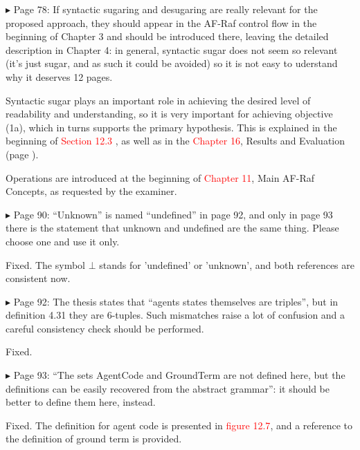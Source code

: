 \documentclass{article}
\newcommand*\R[1]{\textcolor{red}{#1}} %
\newenvironment{them}%
  {\bigskip\noindent\begingroup\color{blue}$\blacktriangleright$\enspace}%
  {\endgroup\par}
\begin{document}
\begin{them}
Page 78:
If syntactic sugaring and desugaring are really relevant for the proposed
approach, they should appear in the AF-Raf control flow in the beginning of
Chapter 3 and should be introduced there, leaving the detailed description in
Chapter 4: in general, syntactic sugar does not seem so relevant (it's just
sugar, and as such it could be avoided) so it is not easy to uderstand why it
deserves 12 pages.
\end{them}

Syntactic sugar plays an important role in achieving the desired level of
readability and understanding, so it is very important for achieving objective
(1a), which in turns supports the primary hypothesis. This is explained in the
beginning of \R{Section 12.3} , as well as in the \R{Chapter 16}, Results and
Evaluation (page ).

Operations are introduced at the beginning of \R{Chapter 11}, Main AF-Raf
Concepts, as requested by the examiner.

\begin{them}
Page 90:
``Unknown'' is named ``undefined'' in page 92, and only in page 93 there is the
statement that unknown and undefined are the same thing. Please choose one and
use it only.
\end{them}
Fixed. The symbol $\bot$ stands for 'undefined' or 'unknown', and both
references are consistent now. 

\begin{them}
Page 92:
The thesis states that ``agents states themselves are triples'', but in
definition 4.31 they are 6-tuples.  Such mismatches raise a lot of confusion
and a careful consistency check should be performed.
\end{them}
Fixed.

\begin{them}
Page 93:
``The sets AgentCode and GroundTerm are not defined here, but the definitions
can be easily recovered from the abstract grammar'': it should be better to
define them here, instead.
\end{them}
Fixed. The definition for agent code is presented in \R{figure 12.7}, and a
reference to the definition of ground term is provided.
\end{document}
